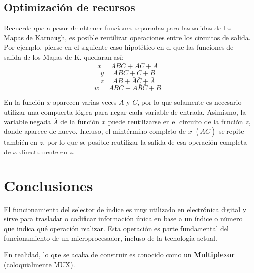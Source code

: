 \subsection{Optimización de recursos}
Recuerde que a pesar de obtener funciones separadas para las salidas de los Mapas de Karnaugh, es posible reutilizar operaciones entre los circuitos de salida.
Por ejemplo, piense en el siguiente caso hipotético en el que las funciones de salida de los Mapas de K. quedaran así:
$$ x = \bar A B \bar C + \bar A \bar C + \bar A$$
$$ y = AB\bar C + \bar C + B $$
$$ z = AB + \bar A \bar C + \bar A $$
$$ w = ABC + A\bar B \bar C + B $$

En la función $x$ aparecen varias veces $\bar A$ y $\bar C$, por lo que solamente es necesario utilizar una compuerta lógica para negar cada variable de entrada. Asimismo,
la variable negada $\bar A$ de la función $x$ puede reutilizarse en el circuito de la función $z$, donde aparece de nuevo. Incluso, el mintérmino completo de $x$ $(\bar A \bar C)$
se repite también en $z$, por lo que se posible reutilizar la salida de esa operación completa de $x$ directamente en $z$. 


\section{Conclusiones}
El funcionamiento del selector de índice es muy utilizado en electrónica digital y sirve para trasladar o codificar información única
en base a un índice o número que indica qué operación realizar. Esta operación es parte fundamental del funcionamiento de un microprocesador,
incluso de la tecnología actual.

\vspace{14pt}

En realidad, lo que se acaba de construir es conocido como un \textbf{Multiplexor} (coloquialmente MUX).